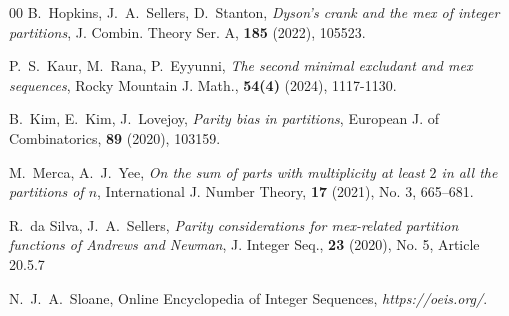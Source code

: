 \documentclass[12pt,reqno]{amsart}
\renewcommand{\(}{\left\(}
\renewcommand{\)}{\right\)}
\renewcommand{\[}{\left\[}
\renewcommand{\]}{\right\]}
\numberwithin{equation}{section}
\theoremstyle{plain}
\begin{document}
\begin{thebibliography}{00}
B.~Hopkins, J.~A.~Sellers, D.~Stanton, \emph{Dyson's crank and the mex of integer partitions}, J. Combin. Theory Ser. A, \textbf{185} (2022), 105523.

P.~S.~Kaur, M.~Rana, P.~Eyyunni, \emph{The second minimal excludant and mex sequences}, Rocky Mountain J. Math., \textbf{54(4)} (2024), 1117-1130.

 B.~Kim, E.~Kim, J.~Lovejoy, \emph{Parity bias in partitions}, European J. of Combinatorics, \textbf{89} (2020), 103159.

M.~Merca, A.~J.~Yee, \emph{On the sum of parts with multiplicity at least $2$ in all the partitions of $n$}, International J. Number Theory, \textbf{17} (2021), No. 3, 665--681.

R.~da Silva,  J.~A.~Sellers, \emph{Parity considerations for mex-related partition functions of Andrews and Newman},  J. Integer Seq., {\bf23} (2020), No. 5, Article 20.5.7

N.~J.~A.~Sloane, Online Encyclopedia of Integer Sequences, \emph{https://oeis.org/}.

\end{thebibliography}

%
%
%
\end{document}
